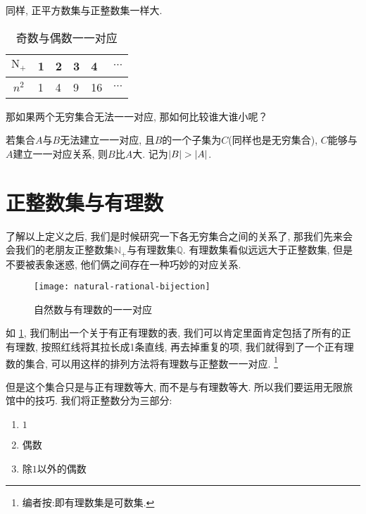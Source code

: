 \documentclass[UTF8]{mathrep}
\begin{document}
同样, 正平方数集与正整数集一样大.

\begin{table}[!h]
  \begin{center}
    \begin{tabular}{c|lllll}
      \toprule
      $\mathrm N_+$ & 1 & 2 & 3 & 4  & $\cdots$ \\
      \midrule
      $n^2$         & 1 & 4 & 9 & 16 & $\cdots$ \\
      \bottomrule
    \end{tabular}
    \caption{奇数与偶数一一对应}
  \end{center}
\end{table}

那如果两个无穷集合无法一一对应, 那如何比较谁大谁小呢？

\begin{definition}
  若集合$A$与$B$无法建立一一对应, 且$B$的一个子集为$C$(同样也是无穷集合), $C$能够与$A$建立一一对应关系, 则$B$比$A$大.
  记为$\left\lvert B \right\rvert > \left\lvert A \right\rvert$.
\end{definition}

\section{正整数集与有理数}

了解以上定义之后, 我们是时候研究一下各无穷集合之间的关系了,
那我们先来会会我们的老朋友正整数集$\mathbb N_+$与有理数集$\mathbb Q$.
有理数集看似远远大于正整数集, 但是不要被表象迷惑, 他们俩之间存在一种巧妙的对应关系.

\begin{figure}[htbp]
  \begin{center}
    \texttt{[image: natural-rational-bijection]}
    \caption{自然数与有理数的一一对应}
    \label{fig:bijection}
  \end{center}
\end{figure}

如 \cref{fig:bijection}, 我们制出一个关于有正有理数的表, 我们可以肯定里面肯定包括了所有的正有理数,
按照红线将其拉长成1条直线, 再去掉重复的项,
我们就得到了一个正有理数的集合, 可以用这样的排列方法将有理数与正整数一一对应.
\footnote{编者按:即有理数集是可数集. }

但是这个集合只是与正有理数等大, 而不是与有理数等大.
所以我们要运用无限旅馆中的技巧.
我们将正整数分为三部分:

\begin{enumerate}
  \item \label{enum:1} ${1}$
  \item \label{enum:2} 偶数
  \item \label{enum:3} 除$1$以外的偶数
\end{enumerate}
\end{document}
